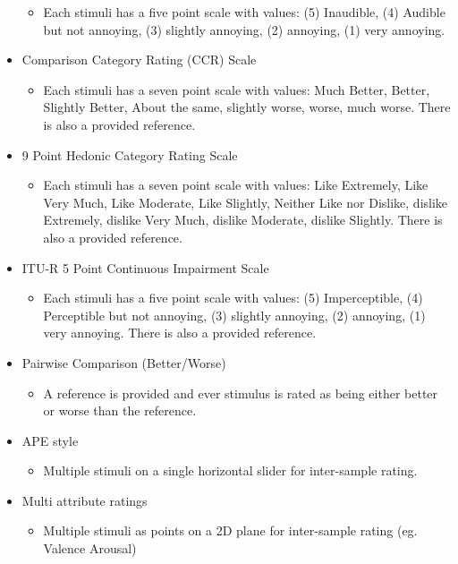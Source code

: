 \documentclass{sig-alternate}
\begin{document}
\begin{itemize}[noitemsep,nolistsep]
\begin{itemize}
			\item Each stimuli has a five point scale with values: (5) Inaudible, (4) Audible but not annoying, (3) slightly annoying, (2) annoying, (1) very annoying.
		\end{itemize}
		\item Comparison Category Rating (CCR) Scale~\cite{rec1996p}
		\begin{itemize}
			\item Each stimuli has a seven point scale with values: Much Better, Better, Slightly Better, About the same, slightly worse, worse, much worse. There is also a provided reference.
		\end{itemize}
		\item 9 Point Hedonic Category Rating Scale~\cite{peryam1952advanced}
		\begin{itemize}
			\item Each stimuli has a seven point scale with values: Like Extremely, Like Very Much, Like Moderate, Like Slightly, Neither Like nor Dislike, dislike Extremely, dislike Very Much, dislike Moderate, dislike Slightly. There is also a provided reference.
			\end{itemize}
		\item ITU-R 5 Point Continuous Impairment Scale~\cite{rec1997bs}
		\begin{itemize}
			\item Each stimuli has a five point scale with values: (5) Imperceptible, (4) Perceptible but not annoying, (3) slightly annoying, (2) annoying, (1) very annoying. There is also a provided reference.
		\end{itemize}
		\item Pairwise Comparison (Better/Worse)~\cite{david1963method}
		\begin{itemize}
			\item A reference is provided and ever stimulus is rated as being either better or worse than the reference.
		\end{itemize}
		\item APE style \cite{ape}
		\begin{itemize}
			\item Multiple stimuli on a single horizontal slider for inter-sample rating.
		\end{itemize}
		\item Multi attribute ratings
		\begin{itemize}
			\item Multiple stimuli as points on a 2D plane for inter-sample rating (eg. Valence Arousal)

\end{itemize}
\end{itemize}
\end{document}
